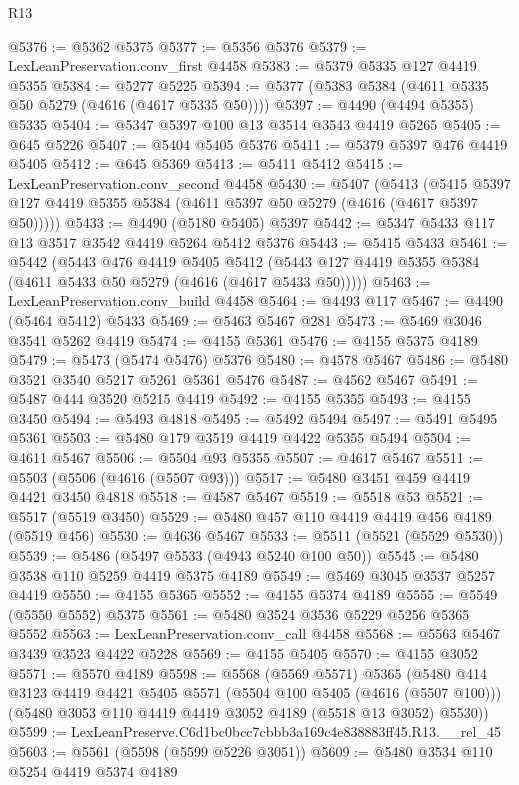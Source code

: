 \begin{lexlean}{R13}
\begin{coremodule}
@5376 := @5362 @5375
@5377 := @5356 @5376
@5379 := LexLeanPreservation.conv_first @4458
@5383 := @5379 @5335 @127 @4419 @5355
@5384 := @5277 @5225
@5394 := @5377 (@5383 @5384 (@4611 @5335 @50 @5279 (@4616 (@4617 @5335 @50))))
@5397 := @4490 (@4494 @5355) @5335
@5404 := @5347 @5397 @100 @13 @3514 @3543 @4419 @5265
@5405 := @645 @5226
@5407 := @5404 @5405 @5376
@5411 := @5379 @5397 @476 @4419 @5405
@5412 := @645 @5369
@5413 := @5411 @5412
@5415 := LexLeanPreservation.conv_second @4458
@5430 := @5407
    (@5413 (@5415 @5397 @127 @4419 @5355 @5384 (@4611 @5397 @50 @5279 (@4616 (@4617 @5397 @50)))))
@5433 := @4490 (@5180 @5405) @5397
@5442 := @5347 @5433 @117 @13 @3517 @3542 @4419 @5264 @5412 @5376
@5443 := @5415 @5433
@5461 := @5442
    (@5443
      @476
      @4419
      @5405
      @5412
      (@5443 @127 @4419 @5355 @5384 (@4611 @5433 @50 @5279 (@4616 (@4617 @5433 @50)))))
@5463 := LexLeanPreservation.conv_build @4458
@5464 := @4493 @117
@5467 := @4490 (@5464 @5412) @5433
@5469 := @5463 @5467 @281
@5473 := @5469 @3046 @3541 @5262 @4419
@5474 := @4155 @5361
@5476 := @4155 @5375 @4189
@5479 := @5473 (@5474 @5476) @5376
@5480 := @4578 @5467
@5486 := @5480 @3521 @3540 @5217 @5261 @5361 @5476
@5487 := @4562 @5467
@5491 := @5487 @444 @3520 @5215 @4419
@5492 := @4155 @5355
@5493 := @4155 @3450
@5494 := @5493 @4818
@5495 := @5492 @5494
@5497 := @5491 @5495 @5361
@5503 := @5480 @179 @3519 @4419 @4422 @5355 @5494
@5504 := @4611 @5467
@5506 := @5504 @93 @5355
@5507 := @4617 @5467
@5511 := @5503 (@5506 (@4616 (@5507 @93)))
@5517 := @5480 @3451 @459 @4419 @4421 @3450 @4818
@5518 := @4587 @5467
@5519 := @5518 @53
@5521 := @5517 (@5519 @3450)
@5529 := @5480 @457 @110 @4419 @4419 @456 @4189 (@5519 @456)
@5530 := @4636 @5467
@5533 := @5511 (@5521 (@5529 @5530))
@5539 := @5486 (@5497 @5533 (@4943 @5240 @100 @50))
@5545 := @5480 @3538 @110 @5259 @4419 @5375 @4189
@5549 := @5469 @3045 @3537 @5257 @4419
@5550 := @4155 @5365
@5552 := @4155 @5374 @4189
@5555 := @5549 (@5550 @5552) @5375
@5561 := @5480 @3524 @3536 @5229 @5256 @5365 @5552
@5563 := LexLeanPreservation.conv_call @4458
@5568 := @5563 @5467 @3439 @3523 @4422 @5228
@5569 := @4155 @5405
@5570 := @4155 @3052
@5571 := @5570 @4189
@5598 := @5568
    (@5569 @5571)
    @5365
    (@5480
      @414
      @3123
      @4419
      @4421
      @5405
      @5571
      (@5504 @100 @5405 (@4616 (@5507 @100)))
      (@5480 @3053 @110 @4419 @4419 @3052 @4189 (@5518 @13 @3052) @5530))
@5599 := LexLeanPreserve.C6d1bc0bcc7cbbb3a169c4e838883ff45.R13.__rel_45
@5603 := @5561 (@5598 (@5599 @5226 @3051))
@5609 := @5480 @3534 @110 @5254 @4419 @5374 @4189

\end{coremodule}
\end{lexlean}
